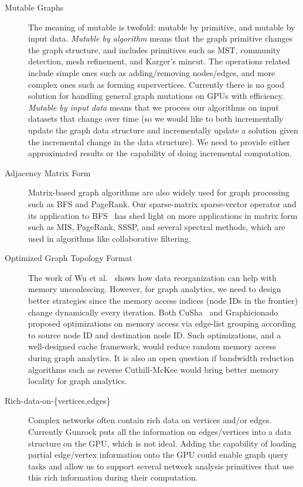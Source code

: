 \documentclass[format=acmsmall,review=false,screen=true]{acmart}
\begin{document}
\begin{description}
\item[Mutable Graphs] The meaning of mutable is twofold: mutable by
  primitive, and mutable by input data. \emph{Mutable by algorithm}
  means that the graph primitive changes the graph structure, and
  includes primitives such as MST, community detection, mesh
  refinement, and Karger's mincut. The operations related include
  simple ones such as adding/removing nodes/edges, and more complex
  ones such as forming supervertices. Currently there is no good
  solution for handling general graph mutations on GPUs with
  efficiency. \emph{Mutable by input data} means that we process our
  algorithms on input datasets that change over time (so we would like
  to both incrementally update the graph data structure and
  incrementally update a solution given the incremental change in the
  data structure). We need to provide either approximated results or
  the capability of doing incremental computation.
\item[Adjacency Matrix Form] Matrix-based graph algorithms are also
  widely used for graph processing such as BFS and PageRank. Our
  sparse-matrix sparse-vector operator and its application to
  BFS~\cite{Yang:2015:FSM} has shed light on more applications in
  matrix form such as MIS, PageRank, SSSP, and several spectral
  methods, which are used in algorithms like collaborative filtering.
\item[Optimized Graph Topology Format]The work of Wu et
  al.~\cite{Wu:2013:CAA} shows how data reorganization can help with
  memory uncoalescing. However, for graph analytics, we need to design
  better strategies since the memory access indices (node IDs in the
  frontier) change dynamically every iteration. Both
  CuSha~\cite{Khorasani:2014:CVG} and
  Graphicionado~\cite{Ham:2016:GAH} proposed optimizations on memory
  access via edge-list grouping according to source node ID and
  destination node ID\@. Such optimizations, and a well-designed cache
  framework, would reduce random memory access during graph analytics.
  It is also an open question if bandwidth reduction algorithms such
  as reverse Cuthill-McKee would bring better memory locality for
  graph analytics.
\item[Rich-data-on-\{vertices,edges\}] Complex networks often contain
  rich data on vertices and/or edges. Currently Gunrock puts all the
  information on edges/vertices into a data structure on the GPU,
  which is not ideal. Adding the capability of loading partial
  edge/vertex information onto the GPU could enable graph query tasks
  and allow us to support several network analysis primitives that use
  this rich information during their computation.
\end{description}
\end{document}
